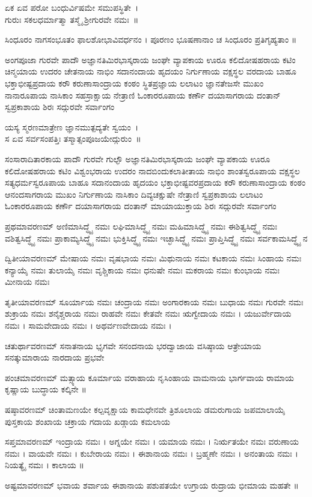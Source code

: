ಏಕ ಏವ ಪರೋ ಬಂಧುರ್ವಿಷಮೇ ಸಮುಪಸ್ಥಿತೇ~।\\
ಗುರುಃ ಸಕಲಧರ್ಮಾತ್ಮಾ ತಸ್ಮೈ ಶ್ರೀಗುರವೇ ನಮಃ~॥

ಸಿಂಧೂರಂ ನಾಗಸಂಭೂತಂ ಫಾಲಶೋಭಾವಿವರ್ಧನಂ ।
ಪೂರಣಂ ಭೂಷಣಾನಾಂ ಚ ಸಿಂಧೂರಂ ಪ್ರತಿಗೃಹ್ಯತಾಂ ॥



ಅಂಗಪೂಜಾ
ಗುರವೇ ಪಾದೌ
ಅಜ್ಞಾನತಿಮಿರಭಾಸ್ಕರಾಯ ಜಂಘೇ
ವ್ಯಾಪಕಾಯ ಊರೂ
ಕಲಿದೋಷಹರಾಯ ಕಟಿಂ
ಚಿನ್ಮಯಾಯ ಉದರಂ
ಚೇತನಾಯ ನಾಭಿಂ
ಸದಾನಂದಾಯ ಹೃದಯಂ
ನಿರ್ಗುಣಾಯ ವಕ್ಷಸ್ಥಲ
ವರದಾಯ ಬಾಹೂ
ಭಕ್ತಾಭೀಷ್ಟಪ್ರದಾಯ ಕರೌ
ಕರುಣಾಸಾಂದ್ರಾಯ ಕಂಠಂ
ಸ್ಥಿತಪ್ರಜ್ಞಾಯ ಲಲಾಟಂ
ಜ್ಞಾನತೇಜಸೇ ಮುಖಂ
ನಾನಾರೂಪಾಯ ನಾಸಿಕಾಂ
ಸಹಸ್ರಾಕ್ಷಾಯ ನೇತ್ರಾಣಿ
ಓಂಕಾರರೂಪಾಯ ಕರ್ಣೌ
ದಯಾಸಾಗರಾಯ ದಂತಾನ್
ಸ್ವಪ್ರಕಾಶಾಯ ಶಿರಃ
ಸದ್ಗುರವೇ ಸರ್ವಾಂಗಂ


ಯಸ್ಯ ಸ್ಮರಣಮಾತ್ರೇಣ ಜ್ಞಾನಮುತ್ಪದ್ಯತೇ ಸ್ವಯಂ~।\\
ಸ ಏವ ಸರ್ವಸಂಪತ್ತಿಃ ತಸ್ಮಾತ್ಸಂಪೂಜಯೇದ್ಗುರುಂ~॥

ಸಂಸಾರಾದಿತಾರಕಾಯ ಪಾದೌ
ಗುರವೇ ಗುಲ್ಫೌ
ಅಜ್ಞಾನತಿಮಿರಭಾಸ್ಕರಾಯ ಜಂಘೇ
ವ್ಯಾಪಕಾಯ ಊರೂ
ಕಲಿದೋಷಹರಾಯ ಕಟಿಂ
ವಿಶ್ವಂಭರಾಯ ಉದರಂ
ನಾದಬಿಂದುಕಲಾತೀತಾಯ ನಾಭಿಂ
ಶಾಂತಸ್ವರೂಪಾಯ ವಕ್ಷಸ್ಥಲ
ಸತ್ಯಧರ್ಮಸ್ವರೂಪಾಯ ಬಾಹೂ
ಸದಾನಂದಾಯ ಹೃದಯಂ
ಭಕ್ತಾಭೀಷ್ಟವರಪ್ರದಾಯ ಕರೌ
ಕರುಣಾಸಾಂದ್ರಾಯ ಕಂಠಂ
ಆನಂದಸಾಗರಾಯ ಮುಖಂ
ನಿರ್ಗುಣಾಯ ನಾಸಿಕಾಂ
ದಿವ್ಯಚಕ್ಷುಷೇ ನೇತ್ರಾಣಿ
ಸ್ವಪ್ರಕಾಶಾಯ ಲಲಾಟಂ
ಓಂಕಾರರೂಪಾಯ ಕರ್ಣೌ
ದಯಾಸಾಗರಾಯ ದಂತಾನ್
ಮಾಯಾಯುಕ್ತಾಯ ಶಿರಃ
ಸದ್ಗುರವೇ ಸರ್ವಾಂಗಂ

ಪ್ರಥಮಾವರಣಮ್
ಅಣಿಮಾಸಿದ್ಧ್ಯೈ ನಮಃ
ಲಘಿಮಾಸಿದ್ಧ್ಯೈ ನಮಃ
ಮಹಿಮಾಸಿದ್ಧ್ಯೈ ನಮಃ
ಈಶಿತ್ವಸಿದ್ಧ್ಯೈ ನಮಃ
ವಶಿತ್ವಸಿದ್ಧ್ಯೈ ನಮಃ
ಪ್ರಾಕಾಮ್ಯಸಿದ್ಧ್ಯೈ ನಮಃ
ಭುಕ್ತಿಸಿದ್ಧ್ಯೈ ನಮಃ
ಇಚ್ಛಾಸಿದ್ಧ್ಯೈ ನಮಃ
ಪ್ರಾಪ್ತಿಸಿದ್ಧ್ಯೈ ನಮಃ
ಸರ್ವಕಾಮಸಿದ್ಧ್ಯೈ ನ

ದ್ವಿತೀಯಾವರಣಮ್
ಮೇಷಾಯ ನಮಃ
ವೃಷಭಾಯ ನಮಃ
ಮಿಥುನಾಯ ನಮಃ
ಕಟಕಾಯ ನಮಃ
ಸಿಂಹಾಯ ನಮಃ
ಕನ್ಯಾಯೈ ನಮಃ
ತುಲಾಯೈ ನಮಃ
ವೃಶ್ಚಿಕಾಯ ನಮಃ
ಧನುಷೇ ನಮಃ
ಮಕರಾಯ ನಮಃ
ಕುಂಭಾಯ ನಮಃ
ಮೀನಾಯ ನಮಃ

ತೃತೀಯಾವರಣಮ್
ಸೂರ್ಯಾಯ ನಮಃ
ಚಂದ್ರಾಯ ನಮಃ
ಅಂಗಾರಕಾಯ ನಮಃ
ಬುಧಾಯ ನಮಃ
ಗುರವೇ ನಮಃ
ಶುಕ್ರಾಯ ನಮಃ
ಶನೈಶ್ಚರಾಯ ನಮಃ
ರಾಹವೇ ನಮಃ
ಕೇತವೇ ನಮಃ
ಋಗ್ವೇದಾಯ ನಮಃ ।
ಯಜುರ್ವೇದಾಯ ನಮಃ ।
ಸಾಮವೇದಾಯ ನಮಃ ।
ಅಥರ್ವಣವೇದಾಯ ನಮಃ ।

ಚತುರ್ಥಾವರಣಮ್
ಸನಾತನಾಯ ಭೃಗವೇ ಸನಂದನಾಯ ಭರದ್ವಾಜಾಯ ವಸಿಷ್ಠಾಯ ಆತ್ರೇಯಾಯ ಸನತ್ಕುಮಾರಾಯ ನಾರದಾಯ ಪ್ರಭವೇ

ಪಂಚಮಾವರಣಮ್
ಮತ್ಸ್ಯಾಯ ಕೂರ್ಮಾಯ ವರಾಹಾಯ ನೃಸಿಂಹಾಯ ವಾಮನಾಯ ಭಾರ್ಗವಾಯ ರಾಮಾಯ ಕೃಷ್ಣಾಯ ಬುದ್ಧಾಯ ಕಲ್ಕಿನೇ ॥

ಷಷ್ಠಾವರಣಮ್
ಚಿಂತಾಮಣಯೇ ಕಲ್ಪವೃಕ್ಷಾಯ ಕಾಮಧೇನವೇ ತ್ರಿಶೂಲಾಯ ಡಮರುಗಾಯ ಜಪಮಾಲಾಯೈ ಪುಸ್ತಕಾಯ ಶಂಖಾಯ ಚಕ್ರಾಯ ಗದಾಯ ಖಡ್ಗಾಯ ಕಮಲಾಯ

ಸಪ್ತಮಾವರಣಮ್
ಇಂದ್ರಾಯ ನಮಃ ।
ಅಗ್ನಯೇ ನಮಃ ।
ಯಮಾಯ ನಮಃ ।
ನಿರ್ಋತಯೇ ನಮಃ 
ವರುಣಾಯ ನಮಃ ।
ವಾಯವೇ ನಮಃ ।
ಕುಬೇರಾಯ ನಮಃ ।
ಈಶಾನಾಯ ನಮಃ ।
ಬ್ರಹ್ಮಣೇ ನಮಃ ।
ಅನಂತಾಯ ನಮಃ ।
ನಿಯತ್ಯೈ ನಮಃ ।
ಕಾಲಾಯ ॥

ಅಷ್ಟಮಾವರಣಮ್
ಭವಾಯ ಶರ್ವಾಯ ಈಶಾನಾಯ ಪಶುಪತಯೇ ಉಗ್ರಾಯ ರುದ್ರಾಯ ಭೀಮಾಯ ಮಹತೇ ॥

